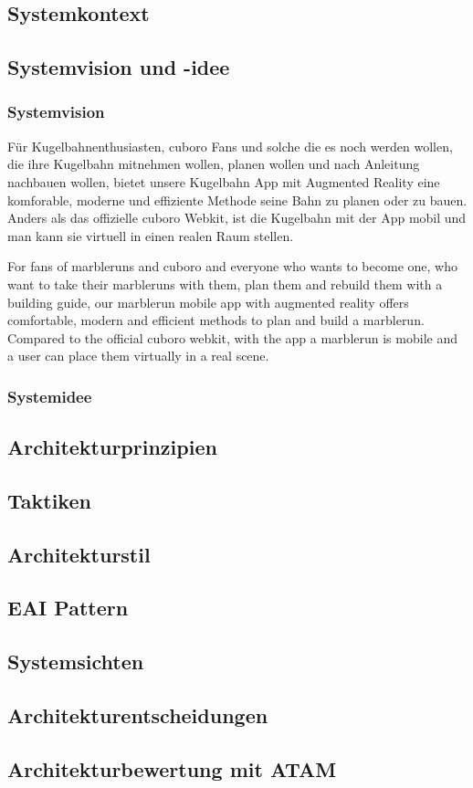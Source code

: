 \subsection{Systemkontext}
\subsection{Systemvision und -idee}
\subsubsection{Systemvision}

Für Kugelbahnenthusiasten, cuboro Fans und solche die es noch werden wollen,
die ihre Kugelbahn mitnehmen wollen, planen wollen und nach Anleitung nachbauen wollen,
bietet unsere Kugelbahn App
mit Augmented Reality
eine komforable, moderne und effiziente Methode seine Bahn zu planen oder zu bauen.
Anders als das offizielle cuboro Webkit,
ist die Kugelbahn mit der App mobil und man kann sie virtuell in einen realen Raum stellen.

For fans of marbleruns and cuboro and everyone who wants to become one,
who want to take their marbleruns with them, plan them and rebuild them with a building guide,
our marblerun mobile app
with augmented reality
offers comfortable, modern and efficient methods to plan and build a marblerun.
Compared to the official cuboro webkit,
with the app a marblerun is mobile and a user can place them virtually in a real scene.

\subsubsection{Systemidee}
\subsection{Architekturprinzipien}
\subsection{Taktiken}
\subsection{Architekturstil}
\subsection{EAI Pattern}
\subsection{Systemsichten}
\subsection{Architekturentscheidungen}
\subsection{Architekturbewertung mit ATAM}

